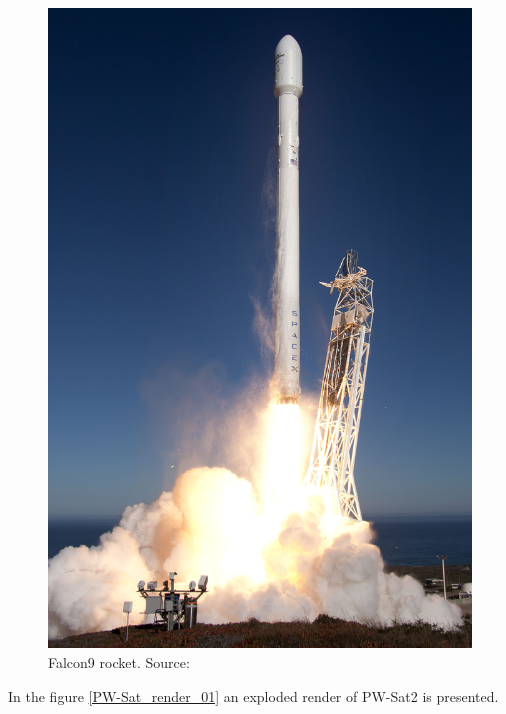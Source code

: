     \begin{figure}[H]
        \centering
        \includegraphics[width=0.3\paperwidth]{img/04/Falcon9.jpg}
        \caption{Falcon9 rocket. Source: \cite{Falcon9_img}}
        \label{Falcon9}
    \end{figure}

    In the figure \ref{PW-Sat_render_01} an exploded render of PW-Sat2 is presented.

